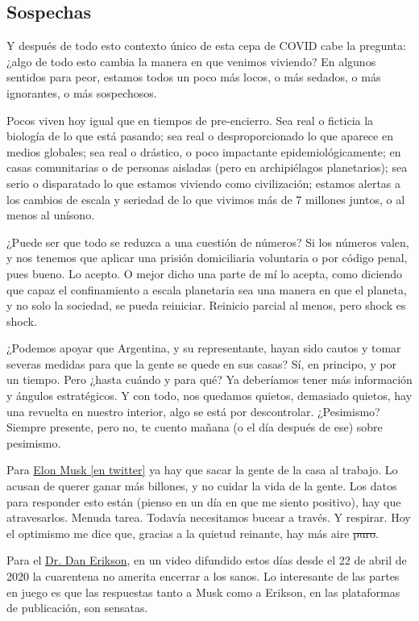 \subsection*{Sospechas}

Y después de todo esto contexto único de esta cepa de COVID cabe la pregunta: 
¿algo de todo esto cambia la manera en que venimos viviendo? 
En algunos sentidos para peor, estamos todos un poco más locos, o más sedados, o más ignorantes, o más sospechosos.

Pocos viven hoy igual que en tiempos de pre-encierro. 
Sea real o ficticia la biología de lo que está pasando;
sea real o desproporcionado lo que aparece en medios globales; 
sea real o drástico, o poco impactante epidemiológicamente; 
en casas comunitarias o de personas aisladas (pero en archipiélagos planetarios); 
sea serio o disparatado lo que estamos viviendo como civilización;
estamos alertas a los cambios de escala y seriedad de lo que vivimos más de 7 millones juntos, 
o al menos al unísono.

¿Puede ser que todo se reduzca a una cuestión de números? Si los números
valen, y nos tenemos que aplicar una prisión domiciliaria voluntaria o
por código penal, pues bueno. Lo acepto. O mejor dicho una parte de mí
lo acepta, como diciendo que capaz el confinamiento a escala planetaria
sea una manera en que el planeta, y no solo la sociedad, se pueda
reiniciar. Reinicio parcial al menos, pero shock es shock.

¿Podemos apoyar que Argentina, y su representante, hayan sido cautos y
tomar severas medidas para que la gente se quede en sus casas? Sí, en
principo, y por un tiempo. Pero ¿hasta cuándo y para qué? Ya deberíamos
tener más información y ángulos estratégicos. Y con todo, nos quedamos
quietos, demasiado quietos, hay una revuelta en nuestro interior, algo
se está por descontrolar. ¿Pesimismo? Siempre presente, pero no, te
cuento mañana (o el día después de ese) sobre pesimismo.

Para \href{https://twitter.com/elonmusk/status/1255380013488189440}{Elon
Musk [en twitter]} ya hay que sacar la gente de la casa al trabajo.
Lo acusan de querer ganar más billones, y no cuidar la vida de la gente. 
Los datos para responder esto están (pienso en un día en que me siento positivo), hay que atravesarlos. Menuda tarea. 
Todavía necesitamos bucear a través. Y respirar. 
Hoy el optimismo me dice que, gracias a la quietud reinante, hay más aire\sout{ puro}.

Para el \href{https://www.youtube.com/watch?v=_F_bgOEMFQg\&feature=youtu.be}{Dr. Dan Erikson}, en un video difundido estos días desde el 22 de abril de 2020
la cuarentena no amerita encerrar a los sanos. 
Lo interesante de las partes en juego es que las respuestas tanto a Musk como a Erikson, en las plataformas de publicación, son sensatas. 
